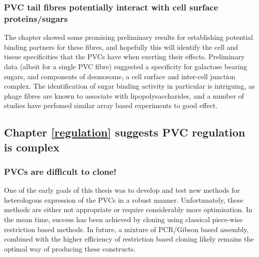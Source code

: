 \subsubsection{PVC tail fibres potentially interact with cell surface proteins/sugars}
The chapter showed some promising preliminary results for establishing potential binding partners for these fibres, and hopefully this will identify the cell and tissue specificities that the PVCs have when exerting their effects. Preliminary data (albeit for a single PVC fibre) suggested a specificity for galactose bearing sugars, and components of desmosome, a cell surface and inter-cell junction complex. The identification of sugar binding activity in particular is intriguing, as phage fibres are known to associate with lipopolysaccharides, and a number of studies have perfomed similar array based experiments to good effect.


\subsection{Chapter \ref{regulation} suggests PVC regulation is complex}
\subsubsection{PVCs are difficult to clone!}
One of the early goals of this thesis was to develop and test new methods for heterologous expression of the PVCs in a robust manner. Unfortunately, these methods are either not appropriate or require considerably more optimisation. In the mean time, success has been achieved by cloning using classical piece-wise restriction based methods. In future, a mixture of PCR/Gibson based assembly, combined with the higher efficiency of restriction based cloning likely remains the optimal way of producing these constructs.

